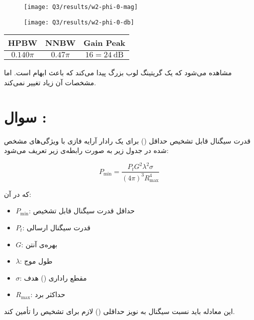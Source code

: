 \documentclass[12pt,onecolumn,a4paper]{article}
\newcommand\question[1][\space]{
	\section[سوال \tartibi{section}]
	{سوال \tartibi{section}: #1}
}
\begin{document}
\begin{figure}[H]
	\centering
	\texttt{[image: Q3/results/w2-phi-0-mag]}
	\caption{}
	\label{fig:w2-phi-0-mag}
\end{figure}
\begin{figure}[H]
	\centering
	\texttt{[image: Q3/results/w2-phi-0-db]}
	\caption{}
	\label{fig:w2-phi-0-db}
\end{figure}
	
	
	\begin{table}[H]
		\centering
		\begin{tabular}{ccc}
			\toprule\rowcolor{gray!10}
			\textbf{HPBW} & \textbf{NNBW} & \textbf{Gain Peak}\\\midrule
			$0.140\pi$ & $0.47\pi$ & $16 = 24 \ \text{dB}$ \\
			\bottomrule
		\end{tabular}
	\end{table}
	
	مشاهده می‌شود که یک گریتینگ لوب بزرگ پیدا می‌کند که باعث ابهام است. اما مشخصات آن زیاد تغییر نمی‌کند.
	
	
	
	
	
	
	\FloatBarrier\question[]%
	

		
		قدرت سیگنال قابل تشخیص حداقل () برای یک رادار آرایه فازی با ویژگی‌های مشخص شده در جدول زیر به صورت رابطه‌ی زیر تعریف می‌شود:
		
		\[
		P_{\text{min}} = \frac{P_t G^2 \lambda^2 \sigma}{(4 \pi)^3 R_{\text{max}}^4}
		\]
		
		که در آن:
		\begin{itemize}
			\item \(P_{\text{min}}\): حداقل قدرت سیگنال قابل تشخیص
			\item \(P_t\): قدرت سیگنال ارسالی
			\item \(G\): بهره‌ی آنتن
			\item \(\lambda\): طول موج
			\item \(\sigma\): مقطع راداری () هدف
			\item \(R_{\text{max}}\): حداکثر برد
		\end{itemize}
		
		این معادله باید نسبت سیگنال به نویز حداقلی () لازم برای تشخیص را تأمین کند.
		
\end{document}
